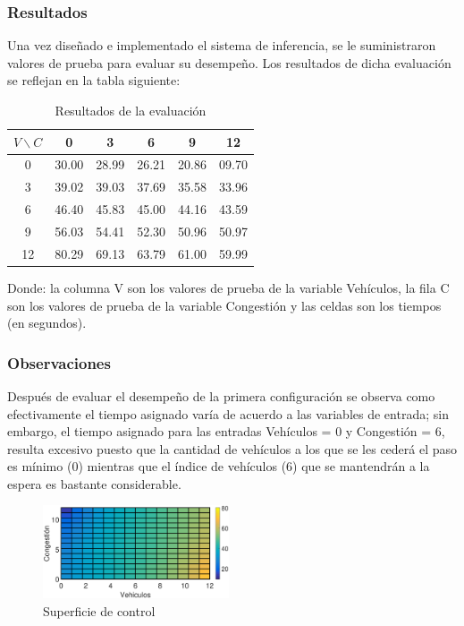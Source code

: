 \newpage
\subsubsection{Resultados}


Una vez diseñado e implementado el sistema de inferencia, se le suministraron valores de prueba para evaluar su desempeño. Los resultados de dicha evaluación se reflejan en la tabla siguiente:

\begin{table}[H]
	\centering
	\begin{tabular}{cccccc} \toprule
		$V \backslash C$ &  0 & 3 & 6 & 9 & 12 \\ \midrule
		0 & 30.00 & 28.99 & 26.21 & 20.86 & 09.70 \\
		3 & 39.02 & 39.03 & 37.69 & 35.58 & 33.96 \\
		6 & 46.40 & 45.83 & 45.00 & 44.16 & 43.59 \\
		9 & 56.03 & 54.41 & 52.30 & 50.96 & 50.97 \\
		12& 80.29 & 69.13 & 63.79 & 61.00 & 59.99 \\
	\end{tabular}
	\caption[Resultados de la evaluación (configuración \textit{A})]{Resultados de la evaluación}
\end{table}
Donde: la columna V son los valores de prueba de la variable Vehículos, la fila C son los valores de  prueba de la variable Congestión y las celdas son los tiempos (en segundos).




\subsubsection{Observaciones}
\begin{multicols}{2}

Después de evaluar el desempeño de la primera configuración se observa como efectivamente el tiempo asignado varía de acuerdo a las variables de entrada; sin embargo, el tiempo asignado para las entradas Vehículos = 0 y Congestión = 6, resulta excesivo puesto que la cantidad de vehículos a los que se les cederá el paso es mínimo (0) mientras que el índice de vehículos (6) que se mantendrán a la espera es bastante considerable.

\begin{figure}[H]
	\includegraphics[width=0.49\textwidth]{Surfaces/Surface2D_A.eps}
	\caption[Superficie de control (configuración \textit{A})]{Superficie de control}
\end{figure}

\end{multicols}

